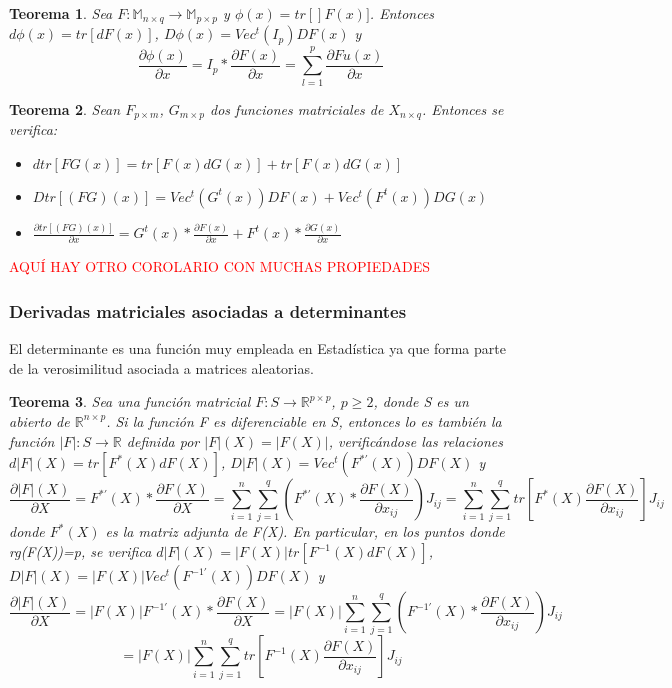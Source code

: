 \documentclass{article}
\theoremstyle{theorem-style}  %
\newtheorem{theorem}{Teorema}[section]  %
\theoremstyle{definition-style}
\theoremstyle{example-style}
\theoremstyle{exercise-style}
\begin{document}
	\begin{theorem}
		Sea $F:\mathbb{M}_{n\times q}\rightarrow \mathbb{M}_{p\times p}$ y $\phi (x) = tr[]F(x)]$. Entonces $d\phi(x)= tr[dF(x)]$, $D\phi(x)= Vec^t(I_p)DF(x)$ y 
		$$ \frac{\partial \phi(x)}{\partial x} = I_p* \frac{\partial F(x)}{\partial x} = \sum_{l=1}^{p} \frac{\partial Fu(x)}{\partial x} $$ 
	\end{theorem}
	
	\begin{theorem}
		Sean $F_{p\times m}$, $G_{m\times p}$ dos funciones matriciales de $X_{n\times q}$. Entonces se verifica:
		\begin{itemize}
			\item $dtr[FG(x)] = tr[F(x)dG(x)]+ tr[F(x)dG(x)]$
			\item $Dtr[(FG)(x)] = Vec^t(G^t(x))DF(x) + Vec^t(F^t(x))DG(x)$
			\item $ \frac{\partial tr[(FG)(x)]}{\partial x} = G^t(x) * \frac{\partial F(x)}{\partial x} + F^t(x) * \frac{\partial G(x)}{\partial x}$
		\end{itemize}
	\end{theorem}
	
	\textcolor{red}{AQUÍ HAY OTRO COROLARIO CON MUCHAS PROPIEDADES}
	
	\subsubsection*{Derivadas matriciales asociadas a determinantes}
	
	El determinante es una función muy empleada en Estadística ya que forma parte de la verosimilitud asociada a matrices aleatorias.
	
	\begin{theorem}
		Sea una función matricial $F: S\rightarrow \mathbb{R}^{p\times p}$, $p \geq 2$, donde S es un abierto de $\mathbb{R}^{n\times p}$. Si la función F es diferenciable en S, entonces lo es también la función $|F|:S\rightarrow \mathbb{R}$ definida por $|F|(X)=|F(X)|$, verificándose las relaciones $d|F|(X) = tr[F^*(X)dF(X)]$, $D|F|(X)=Vec^t(F^{*'}(X))DF(X)$ y $$\frac{\partial |F|(X)}{\partial X} = F^{*'}(X) * \frac{\partial F(X)}{\partial X} = \sum_{i=1}^{n} \sum_{j=1}^{q} \left( F^{*'}(X) *  \frac{\partial F(X)}{\partial x_{ij}} \right)J_{ij} = \sum_{i=1}^{n} \sum_{j=1}^{q} tr \left[ F^*(X)\frac{\partial F(X)}{\partial x_{ij}} \right]J_{ij}$$
		donde $F^*(X)$ es la matriz adjunta de F(X). En particular, en los puntos donde rg(F(X))=p, se verifica $d|F|(X)=|F(X)|tr[F^{-1}(X)dF(X)]$, $D|F|(X)=|F(X)|Vec^t(F^{-1'}(X))DF(X)$ y $$\frac{\partial |F|(X)}{\partial X} = |F(X)|F^{-1'}(X)*\frac{\partial F(X)}{\partial X} = |F(X)|\sum_{i=1}^n \sum_{j=1}^q \left( F^{-1'}(X)* \frac{\partial F(X)}{\partial x_{ij}} \right)J_{ij} $$ $$= |F(X)|\sum_{i=1}^n \sum_{j=1}^q tr\left[F^{-1}(X) \frac{\partial F(X)}{\partial x_{ij}} \right]J_{ij}$$
	\end{theorem}
	
\end{document}

